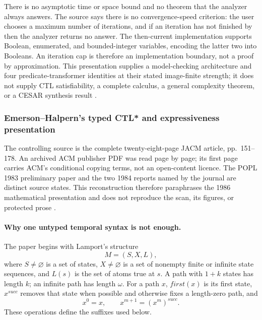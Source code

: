 There is no asymptotic time or space bound and no theorem that the analyzer
always answers.  The source says there is no convergence-speed criterion:
the user chooses a maximum number of iterations, and if an iteration has not
finished by then the analyzer returns no answer.  The then-current
implementation supports Boolean, enumerated, and bounded-integer variables,
encoding the latter two into Booleans.  An iteration cap is therefore an
implementation boundary, not a proof by approximation.  This presentation
supplies a model-checking architecture and four predicate-transformer
identities at their stated image-finite strength; it does not supply CTL
satisfiability, a complete calculus, a general complexity theorem, or a CESAR
synthesis result \cite[pp.~348--350]{QueilleSifakis1982}.

\subsubsection{Emerson--Halpern's typed CTL* and expressiveness presentation}
\label{sec:p09-presentation-n-c-016-emerson-halpern}

The controlling source is the complete twenty-eight-page JACM article,
pp.~151--178.  An archived ACM publisher PDF was read page by page; its first
page carries ACM's conditional copying terms, not an open-content licence.
The POPL 1983 preliminary paper and the two 1984 reports named by the journal
are distinct source states.  This reconstruction therefore paraphrases the
1986 mathematical presentation and does not reproduce the scan, its figures,
or protected prose \cite[pp.~151--153]{EmersonHalpern1986}.

\paragraph{Why one untyped temporal syntax is not enough.}
The paper begins with Lamport's structure
\[
 M=(S,X,L),
\]
where \(S\neq\varnothing\) is a set of states,
\(X\neq\varnothing\) is a set of nonempty finite or infinite state
sequences, and \(L(s)\) is the set of atoms true at \(s\).  A path with
\(1+k\) states has length \(k\); an infinite path has length \(\omega\).
For a path \(x\), \(first(x)\) is its first state,
\(x^{succ}\) removes that state when possible and otherwise fixes a
length-zero path, and
\[
 x^0=x,\qquad x^{m+1}=(x^m)^{succ}.
\]
These operations define the suffixes used below.

